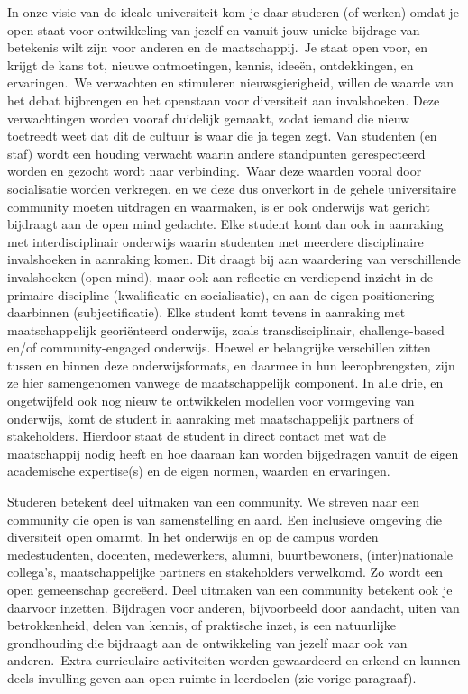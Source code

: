 \documentclass[empirical, authordate, ]{new-jote-article}
\begin{document}
	In onze visie van de ideale universiteit kom je daar studeren (of werken) omdat je open staat voor ontwikkeling van jezelf en vanuit jouw unieke bijdrage van betekenis wilt zijn voor anderen en de maatschappij. Je staat open voor, en krijgt de kans tot, nieuwe ontmoetingen, kennis, ideeën, ontdekkingen, en ervaringen. We verwachten en stimuleren nieuwsgierigheid, willen de waarde van het debat bijbrengen en het openstaan voor diversiteit aan invalshoeken. Deze verwachtingen worden vooraf duidelijk gemaakt, zodat iemand die nieuw toetreedt weet dat dit de cultuur is waar die ja tegen zegt. Van studenten (en staf) wordt een houding verwacht waarin andere standpunten gerespecteerd worden en gezocht wordt naar verbinding. Waar deze waarden vooral door socialisatie worden verkregen, en we deze dus onverkort in de gehele universitaire community moeten uitdragen en waarmaken, is er ook onderwijs wat gericht bijdraagt aan de open mind gedachte. Elke student komt dan ook in aanraking met interdisciplinair onderwijs waarin studenten met meerdere disciplinaire invalshoeken in aanraking komen. Dit draagt bij aan waardering van verschillende invalshoeken (open mind), maar ook aan reflectie en verdiepend inzicht in de primaire discipline (kwalificatie en socialisatie), en aan de eigen positionering daarbinnen (subjectificatie). Elke student komt tevens in aanraking met maatschappelijk georiënteerd onderwijs, zoals transdisciplinair, challenge-based en/of community-engaged onderwijs. Hoewel er belangrijke verschillen zitten tussen en binnen deze onderwijsformats, en daarmee in hun leeropbrengsten, zijn ze hier samengenomen vanwege de maatschappelijk component. In alle drie, en ongetwijfeld ook nog nieuw te ontwikkelen modellen voor vormgeving van onderwijs, komt de student in aanraking met maatschappelijk partners of stakeholders. Hierdoor staat de student in direct contact met wat de maatschappij nodig heeft en hoe daaraan kan worden bijgedragen vanuit de eigen academische expertise(s) en de eigen normen, waarden en ervaringen.



	Studeren betekent deel uitmaken van een community. We streven naar een community die open is van samenstelling en aard. Een inclusieve omgeving die diversiteit open omarmt. In het onderwijs en op de campus worden medestudenten, docenten, medewerkers, alumni, buurtbewoners, (inter)nationale collega's, maatschappelijke partners en stakeholders verwelkomd. Zo wordt een open gemeenschap gecreëerd. Deel uitmaken van een community betekent ook je daarvoor inzetten. Bijdragen voor anderen, bijvoorbeeld door aandacht, uiten van betrokkenheid, delen van kennis, of praktische inzet, is een natuurlijke grondhouding die bijdraagt aan de ontwikkeling van jezelf maar ook van anderen. Extra-curriculaire activiteiten worden gewaardeerd en erkend en kunnen deels invulling geven aan open ruimte in leerdoelen (zie vorige paragraaf).
\end{document}
